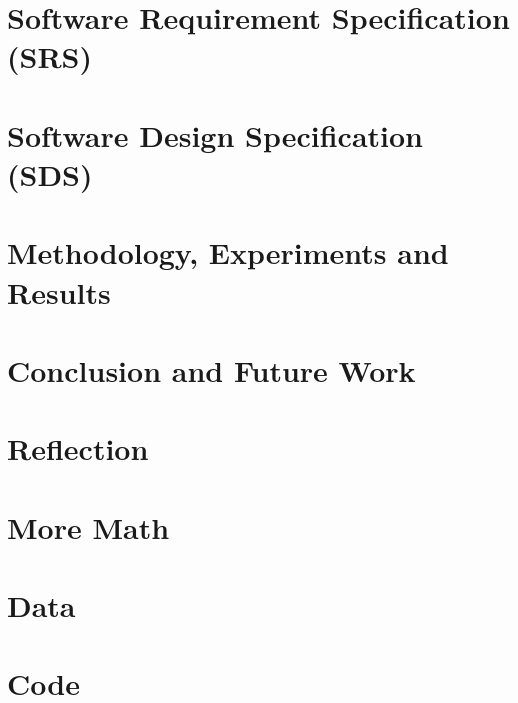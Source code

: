 \documentclass[12pt,twosided]{report}
\begin{document}
\chapter{Software Requirement Specification (SRS)}
\label{chap:srs}


\chapter{Software Design Specification (SDS)}
\label{chap:sds}


\chapter{Methodology, Experiments and Results}
\label{chap:results}


\chapter{Conclusion and Future Work}
\label{chap:outro}


\chapter{Reflection}
\label{chap:Reflection}


\begin{appendices}

  
\chapter{More Math}


\chapter{Data}


\chapter{Code}

\end{appendices}

\printbibliography[heading=bibintoc,title={References}]
\end{document}
